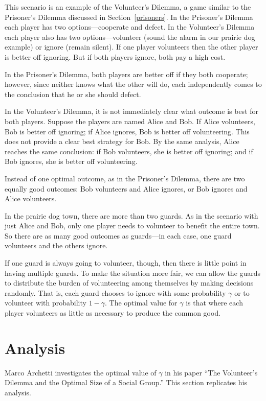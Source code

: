\documentclass[10pt]{book}
\begin{document}
This scenario is an example of the Volunteer's Dilemma, a game similar
to the Prisoner's Dilemma discussed in Section~\ref{prisoners}.  In
the Prisoner's Dilemma each player has two options---cooperate and
defect.  In the Volunteer's Dilemma each player also has two
options---volunteer (sound the alarm in our prairie dog example) or
ignore (remain silent).  If one player volunteers then the other
player is better off ignoring.  But if both players ignore, both pay a
high cost.

In the Prisoner's Dilemma, both players are better off
if they both cooperate; however, since neither knows what the other
will do, each independently comes to the conclusion that he or she
should defect.

In the Volunteer's Dilemma, it is not immediately
clear what outcome is best for both players.  Suppose the players
are named Alice and Bob.  If Alice volunteers, Bob is better off ignoring;
if Alice ignores, Bob is better off volunteering.  This does not
provide a clear best strategy for Bob.  By the same
analysis, Alice reaches the same
conclusion: if Bob volunteers, she is better
off ignoring; and if Bob ignores, she is better off volunteering.

Instead of one optimal outcome, as in the Prisoner's Dilemma, there
are two equally good outcomes: Bob volunteers
and Alice ignores, or Bob ignores and Alice volunteers.

In the prairie dog town, there are more than two guards.  As in the
scenario with just Alice and Bob, only one player needs to volunteer
to benefit the entire town.  So there are as many good outcomes as
guards---in each case, one guard volunteers and the others ignore.

If one guard is always going to volunteer, though, then there is
little point in having multiple guards.  To make the situation more
fair, we can allow the guards to distribute the burden of volunteering among
themselves by making decisions randomly.  That is, each guard 
chooses to ignore with some 
probability $\gamma$ or to volunteer with probability $1 - \gamma$.
The optimal value for $\gamma$ is that where each player volunteers as
little as necessary to produce the common good.

\section{Analysis}

Marco Archetti investigates the optimal value of $\gamma$ in his
paper ``The Volunteer's Dilemma and the Optimal Size of a Social
Group.''  This section replicates his analysis. 
\end{document}
